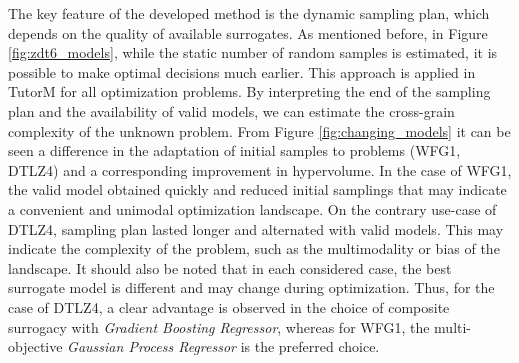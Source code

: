     The key feature of the developed method is the dynamic sampling plan, which depends on the quality of available surrogates. 
    As mentioned before, in Figure \ref{fig:zdt6_models}, while the static number of random samples is estimated, it is possible to make optimal decisions much earlier. This approach is applied in TutorM for all optimization problems. By interpreting the end of the sampling plan and the availability of valid models, we can estimate the cross-grain complexity of the unknown problem. From Figure \ref{fig:changing_models} it can be seen a difference in the adaptation of initial samples to problems (WFG1, DTLZ4) and a corresponding improvement in hypervolume. In the case of WFG1, the valid model obtained quickly and reduced initial samplings that may indicate a convenient and unimodal optimization landscape. On the contrary use-case of DTLZ4, sampling plan lasted longer and alternated with valid models. This may indicate the complexity of the problem, such as the multimodality or bias of the landscape. It should also be noted that in each considered case, the best surrogate model is different and may change during optimization. Thus, for the case of DTLZ4, a clear advantage is observed in the choice of composite surrogacy with \emph{Gradient Boosting Regressor}, whereas for WFG1, the multi-objective \emph{Gaussian Process Regressor} is the preferred choice.
